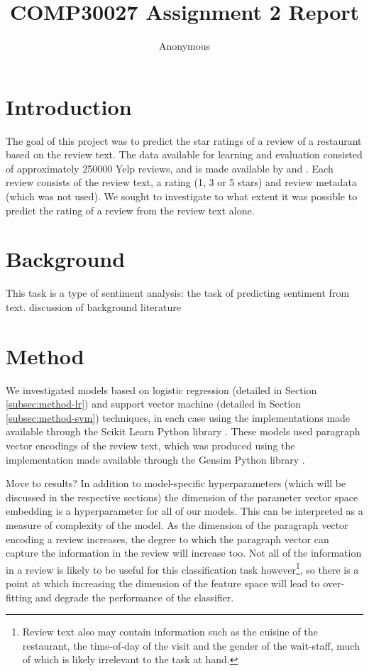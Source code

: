 \documentclass[11pt]{article}
\title{COMP30027 Assignment 2 Report}
\author
{Anonymous}
\newcommand{\drafting}[1]{\textcolor{OliveGreen}{#1}}
\begin{document}
\maketitle

\section{Introduction}
The goal of this project was to predict the star ratings of a review of a restaurant based on the review text. The data available for learning and evaluation consisted of approximately 250000 Yelp reviews, and is made available by \cite{medhat_sentiment_2014} and \cite{rayana_collective_2015}. Each review consists of the review text, a rating (1, 3 or 5 stars) and review metadata (which was not used). We sought to investigate to what extent it was possible to predict the rating of a review from the review text alone. 

\section{Background}
This task is a type of sentiment analysis: the task of predicting sentiment from text. \drafting{discussion of background literature}

\section{Method} \label{sec:method}
We investigated models based on logistic regression (detailed in Section \ref{subsec:method-lr}) and support vector machine (detailed in Section \ref{subsec:method-svm}) techniques, in each case using the implementations made available through the Scikit Learn Python library \cite{sklearn_pedregosa_scikit-learn_2011}. These models used paragraph vector encodings of the review text, which was produced using the implementation made available through the Gensim Python library \cite{gensim_rehurek_software_2010}. 

\drafting{Move to results?}
In addition to model-specific hyperparameters (which will be discussed in the respective sections) the dimension of the parameter vector space embedding is a hyperparameter for all of our models. This can be interpreted as a measure of complexity of the model. As the dimension of the paragraph vector encoding a review increases, the degree to which the paragraph vector can capture the information in the review will increase too. Not all of the information in a review is likely to be useful for this classification task however\footnote{Review text also may contain information such as the cuisine of the restaurant, the time-of-day of the visit and the gender of the wait-staff, much of which is likely irrelevant to the task at hand.}, so there is a point at which increasing the dimension of the feature space will lead to over-fitting and degrade the performance of the classifier.
\end{document}
